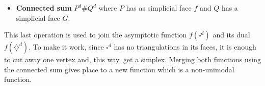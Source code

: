 \bigskip
\begin{itemize}
\item  \textbf{Connected sum} $P^d\#Q^d$ where $P$ has as simplicial face $f$ and $Q$ has a simplicial face $G$. 
\end{itemize}

This last operation is used to join the asymptotic function $f(\square^d)$ and its dual $f(\diamondsuit ^d)$. To make it work, since $\square^d$ has no triangulations in its faces, it is enough to cut away one vertex and, this way, get a simplex. Merging both functions using the connected sum gives place to a new function which is a non-unimodal function.


